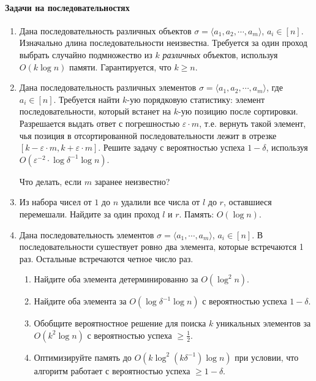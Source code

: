\documentclass{article}
\begin{document}
\paragraph{Задачи на последовательностях}
\begin{enumerate}

    \item Дана последовательность различных объектов $\sigma = \langle a_1, a_2, \cdots, a_m \rangle$, $a_i \in [n]$. Изначально длина последовательности неизвестна. Требуется за один проход выбрать 
    случайно подмножество из $k$ \textit{различных} объектов, используя $O(k \log n)$ памяти. Гарантируется, что $k \geq n$.

    \item Дана последовательность различных элементов $\sigma = \langle a_1, a_2, \cdots, a_m \rangle$, где $a_i \in [n]$. Требуется найти $k$-ую порядковую статистику: элемент последовательности, который встанет на $k$-ую позицию после сортировки. Разрешается выдать ответ с погрешностью $\varepsilon \cdot m$, т.е. вернуть такой элемент, чья позиция в отсортированной последовательности лежит в отрезке $[k - \varepsilon \cdot m, k + \varepsilon \cdot m]$. Решите задачу с вероятностью успеха $1 - \delta$, используя $O(\varepsilon^{-2} \cdot \log{\delta^{-1}} \log n)$.

    Что делать, если $m$ заранее неизвестно?

    \item Из набора чисел от $1$ до $n$ удалили все числа от $l$ до $r$, оставшиеся перемешали. Найдите за один проход $l$ и $r$. Память: $O(\log n)$.
        
    \item Дана последовательность элементов $\sigma = \langle a_1, \cdots, a_m \rangle$, $a_i \in [n]$. 
    В последовательности сушествует ровно два элемента, которые встречаются 1 раз. Остальные встречаются четное число раз. 
    \begin{enumerate}
        \item Найдите оба элемента детерминированно за $O(\log^2 n)$.
        \item Найдите оба элемента за $O(\log \delta^{-1} \log n)$ с вероятностью успеха $1 - \delta$. 
        \item Обобщите вероятностное решение для поиска $k$ уникальных элементов за $O(k^2 \log n)$ с вероятностью успеха $\geq \frac{1}{2}$.
        \item Оптимизируйте память до $O(k \log^2 (k \delta^{-1}) \log n)$ при условии, что алгоритм работает с вероятностью успеха $\geq 1 - \delta$.
    \end{enumerate}

\end{enumerate}
\end{document}
